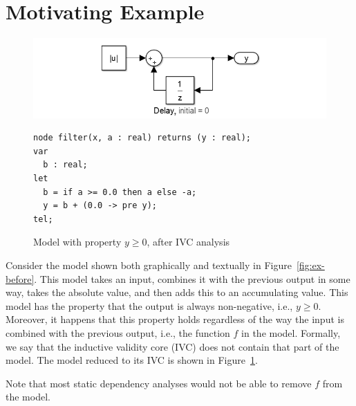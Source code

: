 \section{Motivating Example}
\label{sec:exmpl}

\begin{figure}[t]
\includegraphics[width=\columnwidth]{figs/simulink-ivc.png}
{\smaller
\begin{verbatim}
node filter(x, a : real) returns (y : real);
var
  b : real;
let
  b = if a >= 0.0 then a else -a;
  y = b + (0.0 -> pre y);
tel;
\end{verbatim}
}
\caption{Model with property $y \geq 0$, after IVC analysis}
\label{fig:ex-after}
\end{figure}

Consider the model shown both graphically and textually in
Figure~\ref{fig:ex-before}. This model takes an input, combines it
with the previous output in some way, takes the absolute value, and
then adds this to an accumulating value. This model has the property
that the output is always non-negative, i.e., $y \geq 0$. Moreover, it
happens that this property holds regardless of the way the input is
combined with the previous output, i.e., the function $f$ in the
model. Formally, we say that the inductive validity core (IVC) does
not contain that part of the model. The model reduced to its IVC is
shown in Figure~\ref{fig:ex-after}.

Note that most static dependency analyses would not be able to remove
$f$ from the model.

